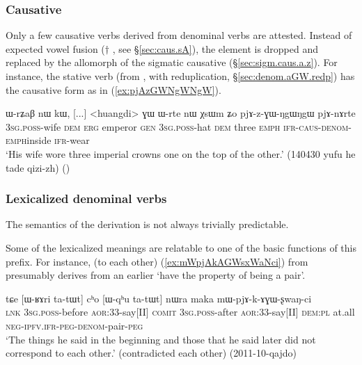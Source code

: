 \subsubsection{Causative}  \label{sec:denom.aGW.caus}
Only a few causative verbs derived from  denominal verbs are attested. Instead of expected vowel fusion ($\dagger$ \fl{} , see §\ref{sec:caus.sA}), the  element is dropped and replaced by the  allomorph of the sigmatic causative (§\ref{sec:sigm.caus.a.z}). For instance, the stative verb  (from , with reduplication, §\ref{sec:denom.aGW.redp}) has the causative form   as in (\ref{ex:pjAzGWNgWNgW}).

\begin{exe}
\ex \label{ex:pjAzGWNgWNgW}
\gll ɯ-rʑaβ nɯ kɯ, [...] <huangdi> ɣɯ ɯ-rte nɯ χsɯm ʑo pjɤ-z-ɣɯ-ŋgɯ\redp{}ŋgɯ pjɤ-nɤrte  \\
\textsc{3sg}.\textsc{poss}-wife \textsc{dem} \textsc{erg} { } emperor \textsc{gen} \textsc{3sg}.\textsc{poss}-hat \textsc{dem} three \textsc{emph} \textsc{ifr}-\textsc{caus}-\textsc{denom}-\textsc{emph}\redp{}inside \textsc{ifr}-wear \\
\glt `His wife wore three imperial crowns one on the top of the other.' (140430 yufu he tade qizi-zh)
()
 \end{exe}
 
 \subsubsection{Lexicalized denominal verbs}  \label{sec:denom.aGW.lexicalized}
The semantics of the  derivation is not always trivially predictable.

Some of the lexicalized meanings are relatable to one of the basic functions of this prefix. For instance,  (to each other) (\ref{ex:mWpjAkAGWsxWaNci}) from  presumably derives from an earlier `have the property of being a pair'.

\begin{exe}
\ex \label{ex:mWpjAkAGWsxWaNci}
\gll tɕe [ɯ-ʁɤri ta-tɯt] cʰo [ɯ-qʰu ta-tɯt] nɯra maka mɯ-pjɤ-k-ɤɣɯ-ʂwaŋ-ci \\
\textsc{lnk} \textsc{3sg}.\textsc{poss}-before \textsc{aor}:3\fl{}3-say[II] \textsc{comit} \textsc{3sg}.\textsc{poss}-after  \textsc{aor}:3\fl{}3-say[II] \textsc{dem}:\textsc{pl} at.all \textsc{neg}-\textsc{ipfv}.\textsc{ifr}-\textsc{peg}-\textsc{denom}-pair-\textsc{peg} \\
\glt `The things he said in the beginning and those that he said later did not correspond to each other.' (contradicted each other) (2011-10-qajdo)
\end{exe}

